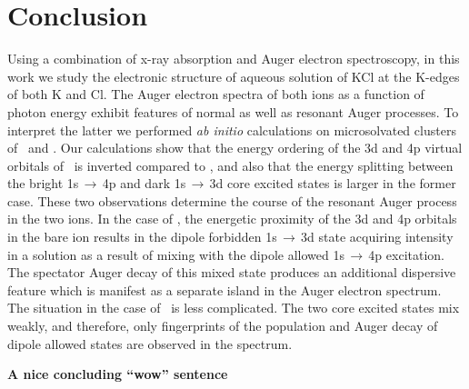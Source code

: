 \section{Conclusion}\label{sec:concl}

Using a combination of x-ray absorption and Auger electron spectroscopy, in this work we study the electronic structure of aqueous solution of KCl at the K-edges of both K and Cl. 
The Auger electron spectra of both ions as a function of photon energy exhibit features of normal as well as resonant Auger processes. To interpret the latter we performed {\it ab initio} calculations on microsolvated clusters of \ki~and \cli. Our calculations show that the energy ordering of the 3d and 4p virtual orbitals of \cli~is inverted compared to \ki, and also that the energy splitting between the bright 1s$\,\rightarrow\,$4p and dark 1s$\,\rightarrow\,$3d core excited states is larger in the former case. These two observations determine the course of the resonant Auger process in the two ions. In the case of \ki, the energetic proximity of the 3d and 4p orbitals in the bare ion results in the dipole forbidden 1s$\,\rightarrow\,$3d state acquiring intensity in a solution as a result of mixing with the dipole allowed 1s$\,\rightarrow\,$4p excitation. The spectator Auger decay of this mixed state produces an additional dispersive feature which is manifest as a separate island in the Auger electron spectrum. The situation in the case of \cli~is less complicated. The two core excited states mix weakly, and therefore, only fingerprints of the population and Auger decay of dipole allowed states are observed in the spectrum.

{\bf\color{red}A nice concluding ``wow'' sentence}
